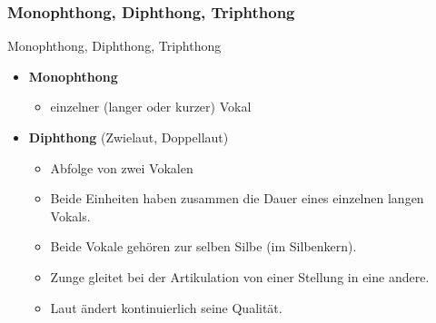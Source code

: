 \subsubsection{Monophthong, Diphthong, Triphthong}

\begin{frame}{Monophthong, Diphthong, Triphthong}

\begin{itemize}
	\item \textbf{Monophthong}

	\begin{itemize}		
		\item einzelner (langer oder kurzer) Vokal
		
	\end{itemize}
	
	\item \textbf{Diphthong} (Zwielaut, Doppellaut)
	
	\begin{itemize}		
		\item Abfolge von zwei Vokalen
		
		\item Beide Einheiten haben zusammen die Dauer eines einzelnen langen Vokals.
		
		\item Beide Vokale gehören zur selben Silbe (im Silbenkern).
		
		\item Zunge gleitet bei der Artikulation von einer Stellung in eine andere.
		
		\item Laut ändert kontinuierlich seine Qualität.
	\end{itemize}
	
\end{itemize}	

\end{frame}


